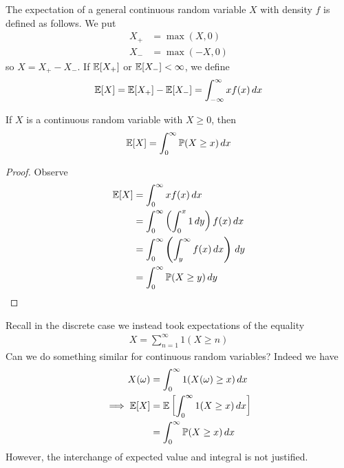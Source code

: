 \documentclass{../../template/note}
\begin{document}
    \begin{definition}
        The expectation of a general continuous random variable \(X\) with density \(f\) is defined as follows. We put
        \begin{align*}
            X_+ &= \max(X, 0) \\
            X_- &= \max(-X, 0)
        \end{align*}
        so \(X = X_+ - X_-\). If \(\mathbb E[X_+]\) or \(\mathbb E[X_-] < \infty\), we define
        \begin{align*}
            \mathbb E[X] = \mathbb E[X_+] - \mathbb E[X_-] = \int_{-\infty}^\infty xf(x) \,d{x}
        \end{align*}
    \end{definition}
    
    \begin{lemma}
        If \(X\) is a continuous random variable with \(X \geq 0\), then
        \begin{align*}
            \mathbb E[X] = \int_0^\infty \mathbb P(X \geq x) \,d{x}
        \end{align*}
    \end{lemma}
    
    \begin{proof}
        Observe
        \begin{align*}
            \mathbb E[X] &= \int_0^\infty xf(x) \,d{x} \\
            &= \int_0^\infty \left(\int_0^x 1 \,d{y}\right) f(x) \,d{x} \\
            &= \int_0^\infty \left(\int_y^\infty f(x) \,d{x}\right) \,d{y} \\
            &= \int_0^\infty\mathbb P(X \geq y) \,d{y}
        \end{align*}
    \end{proof}
    
    \begin{remark*}
        Recall in the discrete case we instead took expectations of the equality
        \begin{align*}
            X = \sum_{n=1}^\infty 1(X \geq n)
        \end{align*}
        Can we do something similar for continuous random variables? Indeed we have
        \begin{align*}
            X(\omega) &= \int_0^\infty 1(X(\omega) \geq x) \,d{x} \\
            \implies \mathbb E[X] &= \mathbb E\left[\int_0^\infty 1(X \geq x) \,d{x}\right] \\
            &= \int_0^\infty \mathbb P(X \geq x) \,d{x}
        \end{align*}
        However, the interchange of expected value and integral is not justified.     
    \end{remark*}
    
\end{document}

